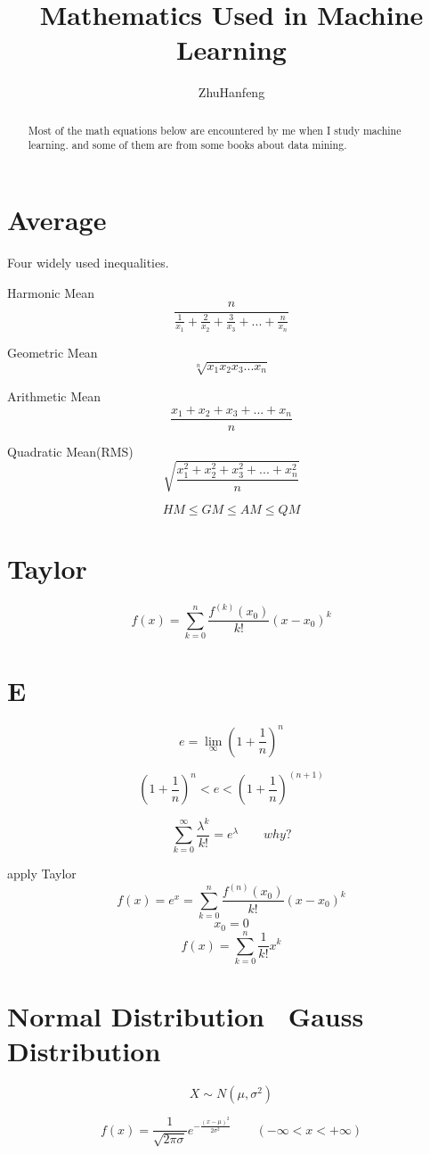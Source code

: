 \documentclass[twocolumn]{article}
\title{Mathematics Used in Machine Learning}
\author{ZhuHanfeng}
\begin{document}
\maketitle

\begin{abstract}
Most of the math equations below are encountered by me when I study machine learning.
and some of them are from some books about data mining.

\end{abstract}

\section{Average}
Four widely used inequalities.

Harmonic Mean
\[\frac{n}{\frac{1}{x_1} + \frac{2}{x_2} + \frac{3}{x_3} + ... + \frac{n}{x_n}}\]

Geometric Mean
\[\sqrt[n]{x_1x_2x_3...x_n}\]

Arithmetic Mean
\[\frac{x_1 + x_2 + x_3 + ... + x_n}{n}\]

Quadratic Mean(RMS)
\[\sqrt{\frac{x_1^2 + x_2^2 + x_3^2 + ... + x_n^2}{n}}\]

\[HM \leq GM \leq AM \leq QM\]
\section{Taylor}
\[f(x) = \sum_{k=0}^n\frac{f^{(k)}(x_0)}{k!}(x-x_0)^k\]

\section{E}

\[e = \lim\limits_{\infty}(1+\frac{1}{n})^n\]

\[(1+\frac{1}{n})^n < e < (1+\frac{1}{n})^{(n+1)}\]

\[\sum\limits_{k=0}^{\infty}\frac{\lambda^k}{k!} = e^\lambda\qquad why?\]

apply Taylor
\[f(x) = e^x = \sum_{k=0}^n\frac{f^{(n)}(x_0)}{k!}{(x-x_0)^k} \]
\[x_0 = 0\]
\[f(x) = \sum_{k=0}^n\frac{1}{k!}x^k\]




\section{Normal Distribution \ Gauss Distribution}
\[X \sim N(\mu, \sigma^2)\]

\[f(x)=\frac{1}{\sqrt{2\pi\sigma}}e^{-\frac{(x-\mu)^2}{2\sigma^2}}\qquad(-\infty < x < +\infty)\]
\end{document}
